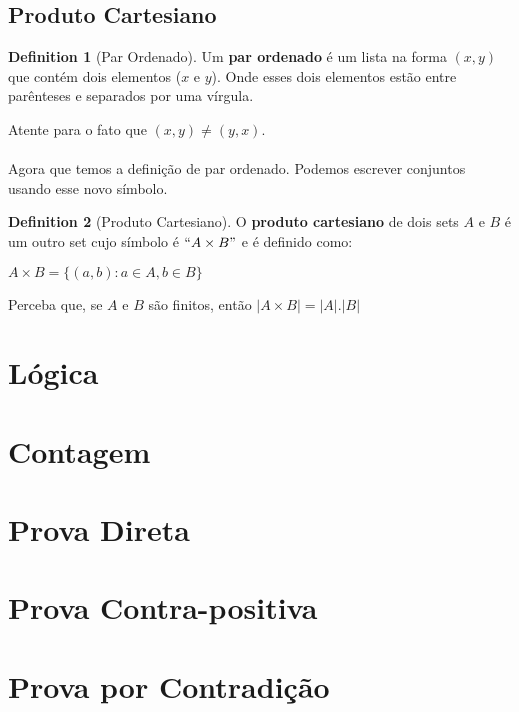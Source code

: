 \documentclass[a4paper,11pt]{book}
\theoremstyle{definition}
\newtheorem{definition}{Definition}[section]
\begin{document}
\section{Produto Cartesiano}
\begin{definition}[Par Ordenado]
Um \textbf{par ordenado} é um lista na forma $(x, y)$ que contém dois elementos ($x$ e $y$). Onde esses dois elementos estão entre parênteses e separados por uma vírgula.
\end{definition}

Atente para o fato que $(x,y) \neq (y,x)$. 
\\
\\
Agora que temos a definição de par ordenado. Podemos escrever conjuntos usando esse novo símbolo.

\begin{definition}[Produto Cartesiano]
O \textbf{produto cartesiano} de dois sets $A$ e $B$ é um outro set cujo símbolo é $``A \times B"$ e é definido como:
\begin{center}
$A \times B = \{ (a,b) : a \in A, b \in B \}$
\end{center}
\end{definition}

Perceba que, se $A$ e $B$ são finitos, então $| A \times B | = |A| . |B|$
\chapter{Lógica}


\chapter{Contagem}
\chapter{Prova Direta}
\chapter{Prova Contra-positiva}
\chapter{Prova por Contradição}
\end{document}
